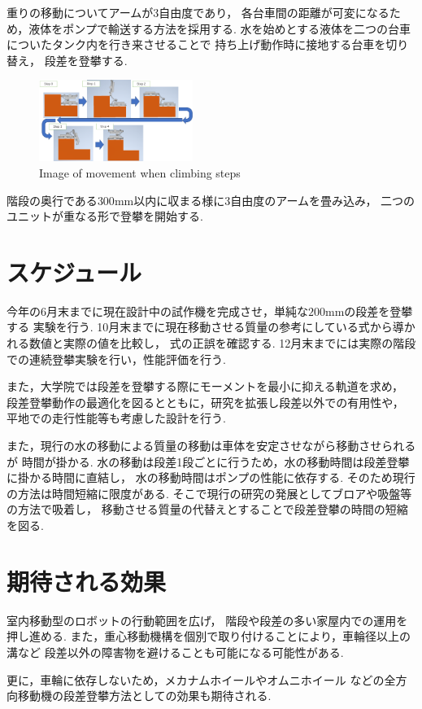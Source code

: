 \documentclass[dvipdfmx]{jsarticle}
\begin{document}
重りの移動についてアームが3自由度であり，
各台車間の距離が可変になるため，液体をポンプで輸送する方法を採用する.
水を始めとする液体を二つの台車についたタンク内を行き来させることで
持ち上げ動作時に接地する台車を切り替え，
段差を登攀する.
\begin{figure}[H]
\centering
\includegraphics[width=50mm]{image/flow}
\caption{Image of movement when climbing steps}
\label{fig:model02}
\end{figure}

階段の奥行である$300\mathrm{mm}$以内に収まる様に3自由度のアームを畳み込み，
二つのユニットが重なる形で登攀を開始する.

\section{スケジュール}
今年の6月末までに現在設計中の試作機を完成させ，単純な$200\mathrm{mm}$の段差を登攀する
実験を行う.
10月末までに現在移動させる質量の参考にしている式から導かれる数値と実際の値を比較し，
式の正誤を確認する.
12月末までには実際の階段での連続登攀実験を行い，性能評価を行う.

また，大学院では段差を登攀する際にモーメントを最小に抑える軌道を求め，
段差登攀動作の最適化を図るとともに，研究を拡張し段差以外での有用性や，
平地での走行性能等も考慮した設計を行う.

また，現行の水の移動による質量の移動は車体を安定させながら移動させられるが
時間が掛かる.
水の移動は段差1段ごとに行うため，水の移動時間は段差登攀に掛かる時間に直結し，
水の移動時間はポンプの性能に依存する.
そのため現行の方法は時間短縮に限度がある.
そこで現行の研究の発展としてブロアや吸盤等の方法で吸着し，
移動させる質量の代替えとすることで段差登攀の時間の短縮を図る.

\section{期待される効果}
室内移動型のロボットの行動範囲を広げ，
階段や段差の多い家屋内での運用を押し進める.
また，重心移動機構を個別で取り付けることにより，車輪径以上の溝など
段差以外の障害物を避けることも可能になる可能性がある.

更に，車輪に依存しないため，メカナムホイールやオムニホイール
などの全方向移動機の段差登攀方法としての効果も期待される.
\end{document}
